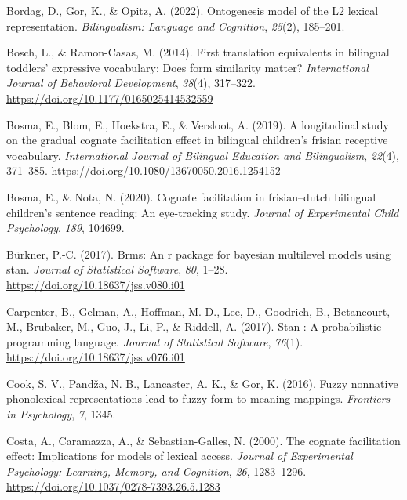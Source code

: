\documentclass[
]{article}
\newlength{\cslhangindent}
\newlength{\cslentryspacingunit} %
\newenvironment{CSLReferences}[2] %
 {%
  \setlength{\parindent}{0pt}
  \ifodd #1
  \let\oldpar\par
  \def\par{\hangindent=\cslhangindent\oldpar}
  \fi
  \setlength{\parskip}{#2\cslentryspacingunit}
 }%
 {}
\begin{document}
\begin{CSLReferences}{1}{0}
\leavevmode{}%
Bordag, D., Gor, K., \& Opitz, A. (2022). Ontogenesis model of the L2
lexical representation. \emph{Bilingualism: Language and Cognition},
\emph{25}(2), 185--201.

\leavevmode{}%
Bosch, L., \& Ramon-Casas, M. (2014). First translation equivalents in
bilingual toddlers' expressive vocabulary: Does form similarity matter?
\emph{International Journal of Behavioral Development}, \emph{38}(4),
317--322. \url{https://doi.org/10.1177/0165025414532559}

\leavevmode{}%
Bosma, E., Blom, E., Hoekstra, E., \& Versloot, A. (2019). A
longitudinal study on the gradual cognate facilitation effect in
bilingual children's frisian receptive vocabulary. \emph{International
Journal of Bilingual Education and Bilingualism}, \emph{22}(4),
371--385. \url{https://doi.org/10.1080/13670050.2016.1254152}

\leavevmode{}%
Bosma, E., \& Nota, N. (2020). Cognate facilitation in frisian--dutch
bilingual children's sentence reading: An eye-tracking study.
\emph{Journal of Experimental Child Psychology}, \emph{189}, 104699.

\leavevmode{}%
Bürkner, P.-C. (2017). Brms: An r package for bayesian multilevel models
using stan. \emph{Journal of Statistical Software}, \emph{80}, 1--28.
\url{https://doi.org/10.18637/jss.v080.i01}

\leavevmode{}%
Carpenter, B., Gelman, A., Hoffman, M. D., Lee, D., Goodrich, B.,
Betancourt, M., Brubaker, M., Guo, J., Li, P., \& Riddell, A. (2017).
Stan : A probabilistic programming language. \emph{Journal of
Statistical Software}, \emph{76}(1).
\url{https://doi.org/10.18637/jss.v076.i01}

\leavevmode{}%
Cook, S. V., Pandža, N. B., Lancaster, A. K., \& Gor, K. (2016). Fuzzy
nonnative phonolexical representations lead to fuzzy form-to-meaning
mappings. \emph{Frontiers in Psychology}, \emph{7}, 1345.

\leavevmode{}%
Costa, A., Caramazza, A., \& Sebastian-Galles, N. (2000). The cognate
facilitation effect: Implications for models of lexical access.
\emph{Journal of Experimental Psychology: Learning, Memory, and
Cognition}, \emph{26}, 1283--1296.
\url{https://doi.org/10.1037/0278-7393.26.5.1283}


\end{CSLReferences}
\end{document}
